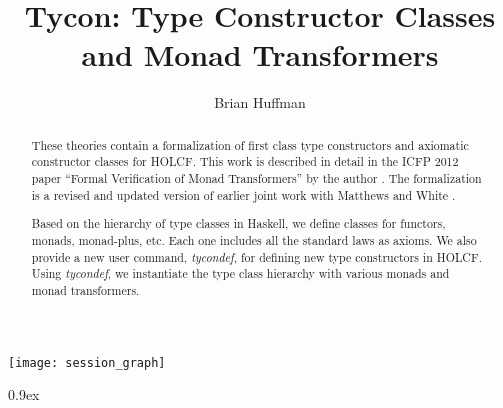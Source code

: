 \documentclass[11pt,a4paper]{article}
\begin{document}
\title{Tycon: Type Constructor Classes \\ and Monad Transformers}
\author{Brian Huffman}
\maketitle

\begin{abstract}

These theories contain a formalization of first class type constructors and axiomatic constructor classes for HOLCF. This work is described in detail in the ICFP 2012 paper ``Formal Verification of Monad Transformers'' by the author \cite{huffman2012}. The formalization is a revised and updated version of earlier joint work with Matthews and White \cite{HMW05}.

Based on the hierarchy of type classes in Haskell, we define classes for functors, monads, monad-plus, etc. Each one includes all the standard laws as axioms. We also provide a new user command, \emph{tycondef}, for defining new type constructors in HOLCF.  Using \emph{tycondef}, we instantiate the type class hierarchy with various monads and monad transformers.

\end{abstract}

\tableofcontents

\begin{center}
  \texttt{[image: session\_graph]}
\end{center}

\newpage

\parindent 0pt
\parskip 0.9ex





\end{document}
